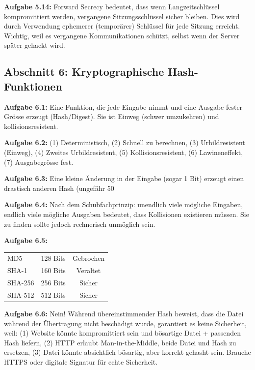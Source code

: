 \documentclass[11pt,a4paper]{report}
\begin{document}
\textbf{Aufgabe 5.14:}
Forward Secrecy bedeutet, dass wenn Langzeitschlüssel kompromittiert werden, vergangene Sitzungsschlüssel sicher bleiben. Dies wird durch Verwendung ephemerer (temporärer) Schlüssel für jede Sitzung erreicht. Wichtig, weil es vergangene Kommunikationen schützt, selbst wenn der Server später gehackt wird.

\subsection*{Abschnitt 6: Kryptographische Hash-Funktionen}

\textbf{Aufgabe 6.1:}
Eine Funktion, die jede Eingabe nimmt und eine Ausgabe fester Grösse erzeugt (Hash/Digest). Sie ist Einweg (schwer umzukehren) und kollisionsresistent.

\textbf{Aufgabe 6.2:}
(1) Deterministisch, (2) Schnell zu berechnen, (3) Urbildresistent (Einweg), (4) Zweites Urbildresistent, (5) Kollisionsresistent, (6) Lawineneffekt, (7) Ausgabegrösse fest.

\textbf{Aufgabe 6.3:}
Eine kleine Änderung in der Eingabe (sogar 1 Bit) erzeugt einen drastisch anderen Hash (ungefähr 50%

\textbf{Aufgabe 6.4:}
Nach dem Schubfachprinzip: unendlich viele mögliche Eingaben, endlich viele mögliche Ausgaben bedeutet, dass Kollisionen existieren müssen. Sie zu finden sollte jedoch rechnerisch unmöglich sein.

\textbf{Aufgabe 6.5:}
\begin{center}
\begin{tabular}{|l|c|c|}
\hline
MD5 & 128 Bits & Gebrochen \\
SHA-1 & 160 Bits & Veraltet \\
SHA-256 & 256 Bits & Sicher \\
SHA-512 & 512 Bits & Sicher \\
\hline
\end{tabular}
\end{center}

\textbf{Aufgabe 6.6:}
Nein! Während übereinstimmender Hash beweist, dass die Datei während der Übertragung nicht beschädigt wurde, garantiert es keine Sicherheit, weil: (1) Website könnte kompromittiert sein und bösartige Datei + passenden Hash liefern, (2) HTTP erlaubt Man-in-the-Middle, beide Datei und Hash zu ersetzen, (3) Datei könnte absichtlich bösartig, aber korrekt gehasht sein. Brauche HTTPS oder digitale Signatur für echte Sicherheit.
\end{document}

